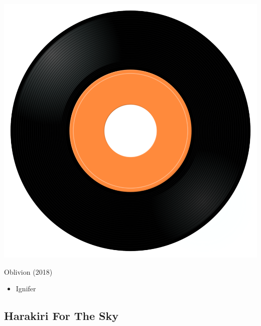 \begin{minipage}[t]{0.25\textwidth}
\captionsetup{type=figure}
\includegraphics[width=\textwidth]{Images/cover.png}
\caption*{Oblivion (2018)}
\end{minipage}
\begin{minipage}[t]{0.25\textwidth}\vspace{0pt}
\begin{itemize}[nosep,leftmargin=1em,labelwidth=*,align=left]
	\setlength{\itemsep}{0pt}
	\item Ignifer
\end{itemize}
\end{minipage}


\subsection{Harakiri For The Sky}

